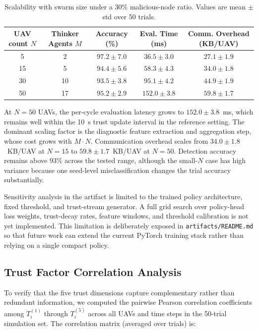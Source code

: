 \documentclass[notspecified,article,submit,moreauthors]{Definitions/mdpi}
\begin{document}
\begin{table}[!htbp]
  \centering
  \caption{Scalability with swarm size under a 30\% malicious-node ratio. Values are mean $\pm$ std over 50 trials.}
  \label{tab:scalability}
  \footnotesize
  \setlength{\tabcolsep}{6pt}
  \renewcommand{\arraystretch}{1.12}
  \begin{tabular}{c c c c c}
    \toprule
    UAV count $N$ & Thinker Agents $M$ & Accuracy (\%) & Eval. Time (ms) & Comm. Overhead (KB/UAV) \\
    \midrule
    5  & 2  & $97.2 \pm 7.0$ & $36.5 \pm 3.0$ & $27.1 \pm 1.9$ \\
    15 & 5  & $94.4 \pm 5.6$ & $58.3 \pm 4.3$ & $34.0 \pm 1.8$ \\
    30 & 10 & $93.5 \pm 3.8$ & $95.1 \pm 4.2$ & $44.9 \pm 1.9$ \\
    50 & 17 & $95.2 \pm 2.9$ & $152.0 \pm 3.8$ & $59.8 \pm 1.7$ \\
    \bottomrule
  \end{tabular}
\end{table}

At $N = 50$ UAVs, the per-cycle evaluation latency grows to $152.0 \pm 3.8$~ms, which remains well within the 10~s trust update interval in the reference setting. The dominant scaling factor is the diagnostic feature extraction and aggregation step, whose cost grows with $M \cdot N$. Communication overhead scales from $34.0 \pm 1.8$~KB/UAV at $N = 15$ to $59.8 \pm 1.7$~KB/UAV at $N = 50$. Detection accuracy remains above 93\% across the tested range, although the small-$N$ case has high variance because one seed-level misclassification changes the trial accuracy substantially.

Sensitivity analysis in the artifact is limited to the trained policy architecture, fixed threshold, and trust-stream generator. A full grid search over policy-head loss weights, trust-decay rates, feature windows, and threshold calibration is not yet implemented. This limitation is deliberately exposed in \texttt{artifacts/README.md} so that future work can extend the current PyTorch training stack rather than relying on a single compact policy.

\subsection{Trust Factor Correlation Analysis}
To verify that the five trust dimensions capture complementary rather than redundant information, we computed the pairwise Pearson correlation coefficients among $T_i^{(1)}$ through $T_i^{(5)}$ across all UAVs and time steps in the 50-trial simulation set. The correlation matrix (averaged over trials) is:
\end{document}
